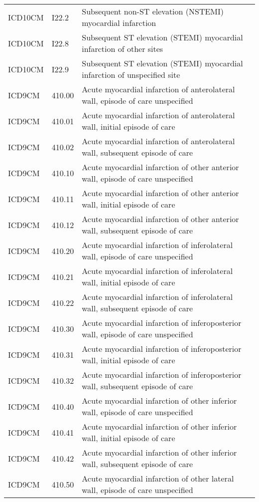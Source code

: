 \begin{longtable}{p{}p{}p{}}
  ICD10CM & I22.2 & Subsequent non-ST elevation (NSTEMI) myocardial infarction \\ 
  ICD10CM & I22.8 & Subsequent ST elevation (STEMI) myocardial infarction of other sites \\ 
  ICD10CM & I22.9 & Subsequent ST elevation (STEMI) myocardial infarction of unspecified site \\ 
  ICD9CM & 410.00 & Acute myocardial infarction of anterolateral wall, episode of care unspecified \\ 
  ICD9CM & 410.01 & Acute myocardial infarction of anterolateral wall, initial episode of care \\ 
  ICD9CM & 410.02 & Acute myocardial infarction of anterolateral wall, subsequent episode of care \\ 
  ICD9CM & 410.10 & Acute myocardial infarction of other anterior wall, episode of care unspecified \\ 
  ICD9CM & 410.11 & Acute myocardial infarction of other anterior wall, initial episode of care \\ 
  ICD9CM & 410.12 & Acute myocardial infarction of other anterior wall, subsequent episode of care \\ 
  ICD9CM & 410.20 & Acute myocardial infarction of inferolateral wall, episode of care unspecified \\ 
  ICD9CM & 410.21 & Acute myocardial infarction of inferolateral wall, initial episode of care \\ 
  ICD9CM & 410.22 & Acute myocardial infarction of inferolateral wall, subsequent episode of care \\ 
  ICD9CM & 410.30 & Acute myocardial infarction of inferoposterior wall, episode of care unspecified \\ 
  ICD9CM & 410.31 & Acute myocardial infarction of inferoposterior wall, initial episode of care \\ 
  ICD9CM & 410.32 & Acute myocardial infarction of inferoposterior wall, subsequent episode of care \\ 
  ICD9CM & 410.40 & Acute myocardial infarction of other inferior wall, episode of care unspecified \\ 
  ICD9CM & 410.41 & Acute myocardial infarction of other inferior wall, initial episode of care \\ 
  ICD9CM & 410.42 & Acute myocardial infarction of other inferior wall, subsequent episode of care \\ 
  ICD9CM & 410.50 & Acute myocardial infarction of other lateral wall, episode of care unspecified \\ 

\end{longtable}
